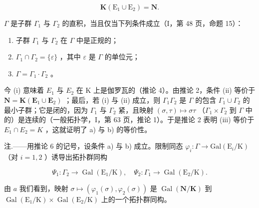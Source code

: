 \[
\mathbf {K} \left(\mathrm{E} _ {1} \cup \mathrm{E} _ {2}\right) = \mathbf {N}.
\]

\(\Gamma\) 是子群 \(\Gamma_{1}\) 与 \(\Gamma_{2}\) 的直积，当且仅当下列条件成立（I，第 48 页，命题 15）：

\begin{enumerate}
\def\labelenumi{(\roman{enumi})}
\item
  子群 \(\Gamma_{1}\) 与 \(\Gamma_{2}\) 在 \(\Gamma\) 中是正规的；
\item
  \(\Gamma_1 \cap \Gamma_2 = \{\varepsilon\}\) ，其中 \(\varepsilon\) 是 \(\Gamma\) 的单位元；
\item
  \(\Gamma = \Gamma_{1} \cdot \Gamma_{2}\) 。
\end{enumerate}

今 (i) 意味着 \(E_{1}\) 与 \(E_{2}\) 在 K 上是伽罗瓦的（推论 4）。由推论 2，条件 (ii) 等价于 \(\mathbf{N} = \mathbf{K}(\mathbf{E}_{1} \cup \mathbf{E}_{2})\) ；最后，若 (i) 与 (ii) 成立，则 \(\Gamma_{1}\Gamma_{2}\) 是 \(\Gamma\) 的包含 \(\Gamma_{1} \cup \Gamma_{2}\) 的最小子群；它是闭的，因为 \(\Gamma_{1}\) 与 \(\Gamma_{2}\) 紧，且映射 \((\sigma, \tau) \mapsto \sigma\tau\) （\(\Gamma_{1} \times \Gamma_{2}\) 到 \(\Gamma\) 中的）是连续的（一般拓扑学，I，第 63 页，推论 1）。于是推论 2 表明 (iii) 等价于 \(E_{1} \cap E_{2} = K\) ，这就证明了 a) 与 b) 的等价性。

注.——用推论 6 的记号，设条件 a) 与 b) 成立。限制同态 \(\varphi_{i}:\Gamma\to\mathrm{Gal}(\mathrm{E}_{i}/\mathrm{K})\) （对 \(i=1,2\) ）诱导出拓扑群同构

\[
\Psi_ {1}: \Gamma_ {2} \rightarrow \operatorname{Gal} \left(\mathrm{E} _ {1} / \mathrm{K}\right), \quad \Psi_ {2}: \Gamma_ {1} \rightarrow \operatorname{Gal} \left(\mathrm{E} _ {2} / \mathrm{K}\right).
\]

由 \(a\) 我们看到，映射 \(\sigma \mapsto (\varphi_1(\sigma), \varphi_2(\sigma))\) 是 \(\operatorname{Gal}(\mathbf{N}/\mathbf{K})\) 到 \(\operatorname{Gal}(\mathrm{E}_1/\mathrm{K}) \times \operatorname{Gal}(\mathrm{E}_2/\mathrm{K})\) 上的一个拓扑群同构。
